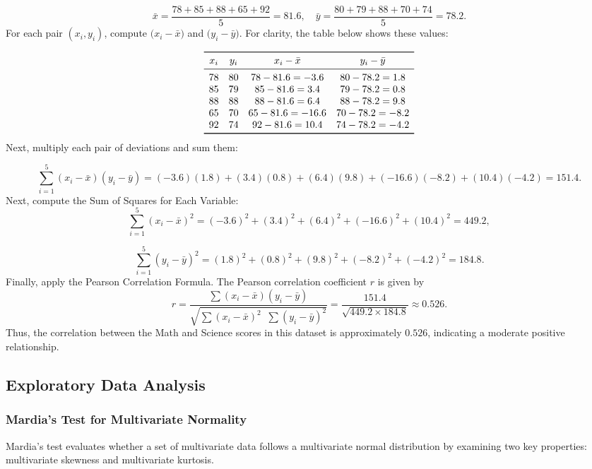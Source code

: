 \documentclass[11pt]{report} %
\begin{document}
\[
\bar{x} = \frac{78 + 85 + 88 + 65 + 92}{5} = 81.6,\quad
\bar{y} = \frac{80 + 79 + 88 + 70 + 74}{5} = 78.2.
\]
For each pair \((x_i, y_i)\), compute \(\bigl(x_i - \bar{x}\bigr)\) and \(\bigl(y_i - \bar{y}\bigr)\). For clarity, the table below shows these values:

\[
\begin{array}{cccc}
\toprule
x_i & y_i & x_i - \bar{x} & y_i - \bar{y} \\
\midrule
78 & 80 & 78 - 81.6 = -3.6 & 80 - 78.2 = 1.8 \\
85 & 79 & 85 - 81.6 = 3.4  & 79 - 78.2 = 0.8 \\
88 & 88 & 88 - 81.6 = 6.4  & 88 - 78.2 = 9.8 \\
65 & 70 & 65 - 81.6 = -16.6 & 70 - 78.2 = -8.2 \\
92 & 74 & 92 - 81.6 = 10.4 & 74 - 78.2 = -4.2 \\
\bottomrule
\end{array}
\]
Next, multiply each pair of deviations and sum them:

\[
\sum_{i=1}^{5} (x_i - \bar{x})(y_i - \bar{y}) 
= (-3.6)(1.8) + (3.4)(0.8) + (6.4)(9.8) + (-16.6)(-8.2) + (10.4)(-4.2)= 151.4.
\]
Next, compute the Sum of Squares for Each Variable:
\[
\sum_{i=1}^{5} (x_i - \bar{x})^2
= (-3.6)^2 + (3.4)^2 + (6.4)^2 + (-16.6)^2 + (10.4)^2 = 449.2,
\]

\[
\sum_{i=1}^{5} (y_i - \bar{y})^2
= (1.8)^2 + (0.8)^2 + (9.8)^2 + (-8.2)^2 + (-4.2)^2 = 184.8.
\]
Finally, apply the Pearson Correlation Formula. The Pearson correlation coefficient \(r\) is given by
\[
r 
= 
\frac{\sum (x_i - \bar{x})(y_i - \bar{y})}
     {\sqrt{\sum (x_i - \bar{x})^2 \;\; \sum (y_i - \bar{y})^2}}
=
\frac{151.4}{\sqrt{449.2 \times 184.8}}
\approx 0.526.
\]
Thus, the correlation between the Math and Science scores in this dataset is approximately \(0.526\), indicating a moderate positive relationship.

\subsection{Exploratory Data Analysis}
\subsubsection{Mardia's Test for Multivariate Normality}
\label{Mardia's Test for MVN}

Mardia's test evaluates whether a set of multivariate data follows a multivariate normal distribution by examining two key properties: {multivariate skewness} and {multivariate kurtosis}.\cite{von2004testing}
\end{document}
